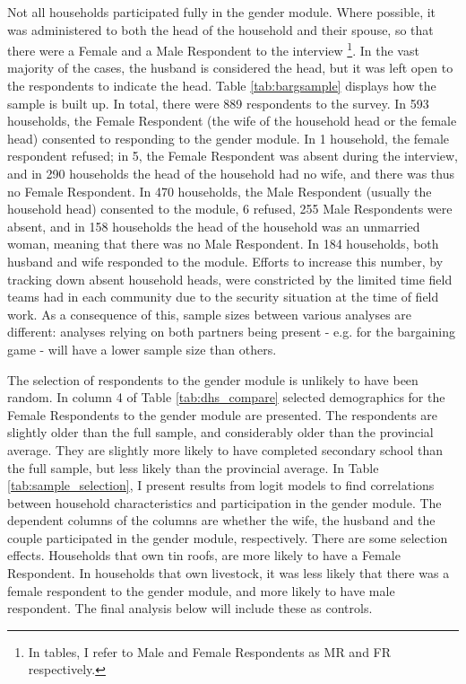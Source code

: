 Not all households participated fully in the gender module. Where possible, it was administered to both the head of the household and their spouse, so that there were a Female and a Male Respondent to the interview \footnote{In tables, I refer to Male and Female Respondents as MR and FR respectively.}. In the vast majority of the cases, the husband is considered the head, but it was left open to the respondents to indicate the head. Table \ref{tab:bargsample} displays how the sample is built up. In total, there were 889 respondents to the survey. In 593 households, the Female Respondent (the wife of the household head or the female head) consented to responding to the gender module. In 1 household, the female respondent refused; in 5, the Female Respondent was absent during the interview, and in 290 households the head of the household had no wife, and there was thus no Female Respondent. In 470 households, the Male Respondent (usually the household head) consented to the module, 6 refused, 255 Male Respondents were absent, and in 158 households the head of the household was an unmarried woman, meaning that there was no Male Respondent. In 184 households, both husband and wife responded to the module. Efforts to increase this number, by tracking down absent household heads, were constricted by the limited time field teams had in each community due to the security situation at the time of field work. As a consequence of this, sample sizes between various analyses are different: analyses relying on both partners being present - e.g. for the bargaining game - will have a lower sample size than others.

The selection of respondents to the gender module is unlikely to have been random. In column 4 of Table \ref{tab:dhs_compare} selected demographics for the Female Respondents to the gender module are presented. The respondents are slightly older than the full sample, and considerably older than the provincial average. They are slightly more likely to have completed secondary school than the full sample, but less likely than the provincial average. In Table \ref{tab:sample_selection}, I present results from logit models to find correlations between household characteristics and participation in the gender module. The dependent columns of the columns are whether the wife, the husband and the couple participated in the gender module, respectively. There are some selection effects. Households that own tin roofs, are more likely to have a Female Respondent. In households that own livestock, it was less likely that there was a female respondent to the gender module, and more likely to have male respondent. The final analysis below will include these as controls.

